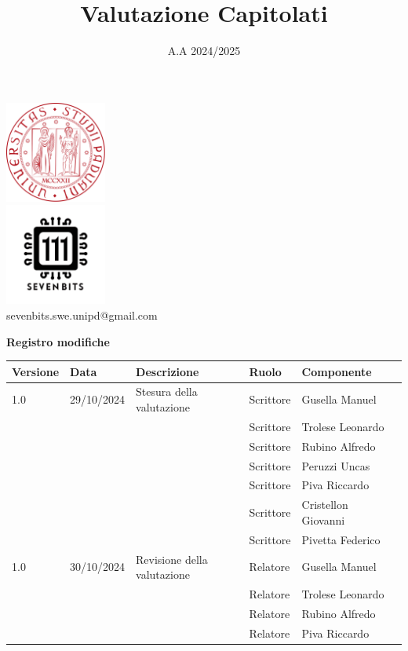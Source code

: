 \documentclass[10pt]{article}
\title{Valutazione Capitolati}
\date{A.A 2024/2025}
\begin{document}
\maketitle
\begin{center}
\includegraphics[width=0.25\textwidth]{LogoUnipd}\\
\includegraphics[width=0.25\textwidth]{Sevenbitslogo}\\
sevenbits.swe.unipd@gmail.com\\
\vspace{2mm}

\textbf{Registro modifiche}\\
\vspace{2mm}
\begin{tabular}{|l|l|l|l|l|l|}
\hline
\textbf{Versione} & \textbf{Data} & \textbf{Descrizione} & \textbf{Ruolo} & \textbf{Componente} \\
\hline
1.0 & 29/10/2024 & Stesura della valutazione & Scrittore & Gusella Manuel\\
& & & Scrittore & Trolese Leonardo\\
& & & Scrittore & Rubino Alfredo\\
& & & Scrittore & Peruzzi Uncas\\
& & & Scrittore & Piva Riccardo\\
& & & Scrittore & Cristellon Giovanni\\
& & & Scrittore & Pivetta Federico\\
\hline
1.0 & 30/10/2024 & Revisione della valutazione & Relatore & Gusella Manuel\\
& & & Relatore & Trolese Leonardo\\
& & & Relatore & Rubino Alfredo\\
& & & Relatore & Piva Riccardo\\
\hline
\end{tabular}
\end{center}
\newpage
\tableofcontents
\newpage
\end{document}
